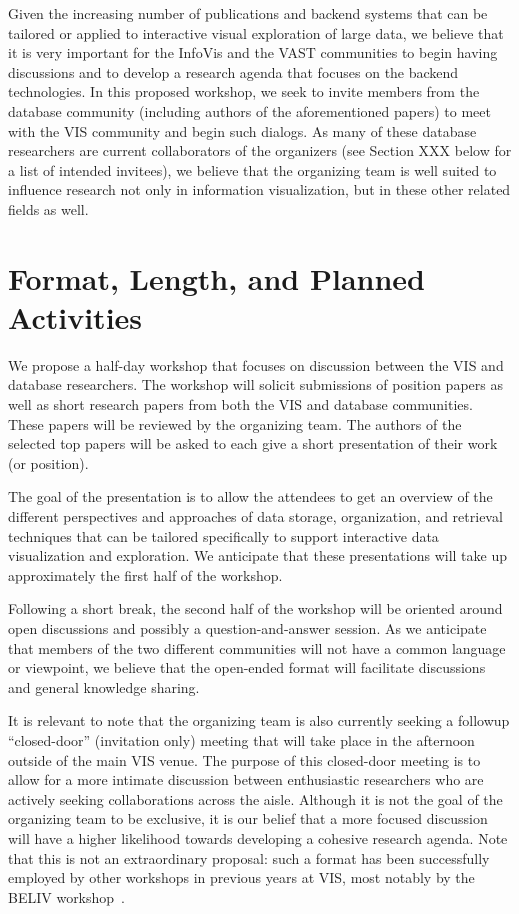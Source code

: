 \documentclass[journal]{vgtc}                %
\begin{document}
Given the increasing number of publications and backend systems that
can be tailored or applied to interactive visual exploration of large
data, we believe that it is very important for the InfoVis and the
VAST communities to begin having discussions and to develop a research
agenda that focuses on the backend technologies. In this proposed
workshop, we seek to invite members from the database community
(including authors of the aforementioned papers) to meet with the VIS
community and begin such dialogs. As many of these database
researchers are current collaborators of the organizers (see Section
XXX below for a list of intended invitees), we believe that the
organizing team is well suited to influence research not only in
information visualization, but in these other related fields as well.

\section{Format, Length, and Planned Activities}
We propose a half-day workshop that focuses on discussion between the
VIS and database researchers. The workshop will solicit submissions of
position papers as well as short research papers from both the VIS and
database communities. These papers will be reviewed by the organizing
team. The authors of the selected top papers will be asked to each
give a short presentation of their work (or position).

The goal of the presentation is to allow the attendees to get an
overview of the different perspectives and approaches of data storage,
organization, and retrieval techniques that can be tailored
specifically to support interactive data visualization and
exploration. We anticipate that these presentations will take up
approximately the first half of the workshop.

Following a short break, the second half of the workshop will be
oriented around open discussions and possibly a question-and-answer
session. As we anticipate that members of the two different
communities will not have a common language or viewpoint, we believe
that the open-ended format will facilitate discussions and general
knowledge sharing.

It is relevant to note that the organizing team is also currently
seeking a followup ``closed-door'' (invitation only) meeting that will
take place in the afternoon outside of the main VIS venue. The purpose
of this closed-door meeting is to allow for a more intimate discussion
between enthusiastic researchers who are actively seeking
collaborations across the aisle. Although it is not the goal of the
organizing team to be exclusive, it is our belief that a more focused
discussion will have a higher likelihood towards developing a cohesive
research agenda. Note that this is not an extraordinary proposal: such
a format has been successfully employed by other workshops in previous
years at VIS, most notably by the BELIV workshop~\cite{beliv}.
\end{document}
